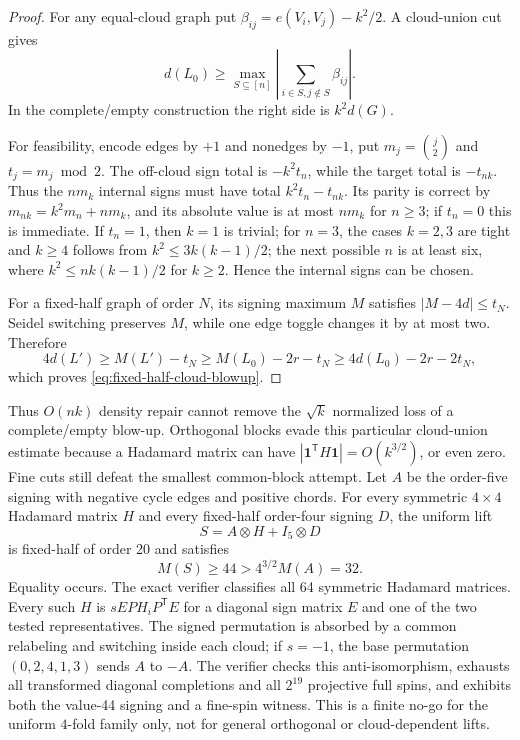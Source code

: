 \documentclass[11pt]{article}
\begin{document}
\begin{proof}
For any equal-cloud graph put
$\beta_{ij}=e(V_i,V_j)-k^2/2$.  A cloud-union cut gives
\[
 d(L_0)\ge\max_{S\subseteq[n]}
 \left|\sum_{i\in S,j\notin S}\beta_{ij}\right|.
\]
In the complete/empty construction the right side is $k^2d(G)$.

For feasibility, encode edges by $+1$ and nonedges by $-1$, put
$m_j=\binom j2$ and $t_j=m_j\bmod2$.  The off-cloud sign total is
$-k^2t_n$, while the target total is $-t_{nk}$.  Thus the $nm_k$ internal
signs must have total $k^2t_n-t_{nk}$.  Its parity is correct by
$m_{nk}=k^2m_n+nm_k$, and its absolute value is at most $nm_k$ for $n\ge3$;
if $t_n=0$ this is immediate.  If $t_n=1$, then $k=1$ is trivial; for
$n=3$, the cases $k=2,3$ are tight and $k\ge4$ follows from
$k^2\le3k(k-1)/2$; the next possible $n$ is at least six, where
$k^2\le nk(k-1)/2$ for $k\ge2$.  Hence the internal signs can be chosen.

For a fixed-half graph of order $N$, its signing maximum $M$ satisfies
$|M-4d|\le t_N$.  Seidel switching preserves $M$, while one edge toggle
changes it by at most two.  Therefore
\[
 4d(L')\ge M(L')-t_N
 \ge M(L_0)-2r-t_N
 \ge4d(L_0)-2r-2t_N,
\]
which proves \eqref{eq:fixed-half-cloud-blowup}.
\end{proof}

Thus $O(nk)$ density repair cannot remove the $\sqrt{k}$ normalized loss of
a complete/empty blow-up.  Orthogonal blocks evade this particular
cloud-union estimate because a Hadamard matrix can have
$|\mathbf1^{\mathsf T}H\mathbf1|=O(k^{3/2})$, or even zero.  Fine cuts still
defeat the smallest common-block attempt.  Let $A$ be the order-five signing
with negative cycle edges and positive chords.  For every symmetric
$4\times4$ Hadamard matrix $H$ and every fixed-half order-four signing $D$,
the uniform lift
\[
 S=A\otimes H+I_5\otimes D
\]
is fixed-half of order 20 and satisfies
\[
 M(S)\ge44>4^{3/2}M(A)=32.
\]
Equality occurs.  The exact verifier classifies all 64 symmetric Hadamard
matrices.  Every such $H$ is $sEPH_iP^{\mathsf T}E$ for a diagonal sign matrix
$E$ and one of the two tested
representatives.  The signed permutation is absorbed by a common relabeling
and switching inside each cloud; if $s=-1$, the base permutation
$(0,2,4,1,3)$ sends $A$ to $-A$.  The verifier checks this anti-isomorphism,
exhausts all transformed diagonal completions and all $2^{19}$ projective
full spins, and exhibits both the value-44 signing and a fine-spin witness.
This
is a finite no-go for the uniform $4$-fold family only, not for general
orthogonal or cloud-dependent lifts.
\end{document}
